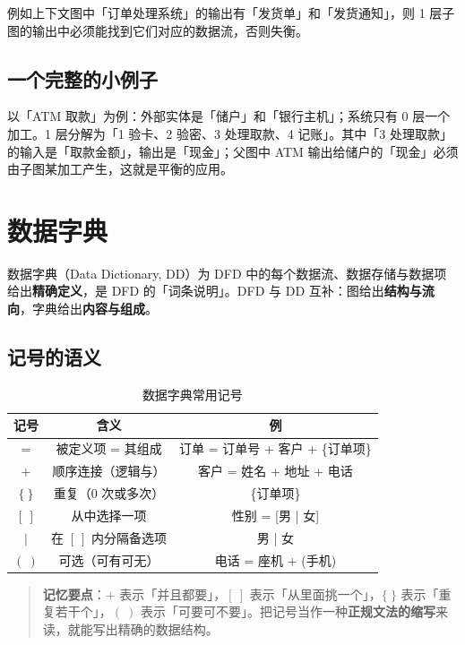 例如上下文图中「订单处理系统」的输出有「发货单」和「发货通知」，则 1 层子图的输出中必须能找到它们对应的数据流，否则失衡。

\subsection{一个完整的小例子}

以「ATM 取款」为例：外部实体是「储户」和「银行主机」；系统只有 0 层一个加工。1 层分解为「1 验卡、2 验密、3 处理取款、4 记账」。其中「3 处理取款」的输入是「取款金额」，输出是「现金」；父图中 ATM 输出给储户的「现金」必须由子图某加工产生，这就是平衡的应用。

\section{数据字典}

数据字典（Data Dictionary, DD）为 DFD 中的每个数据流、数据存储与数据项给出\textbf{精确定义}，是 DFD 的「词条说明」。DFD 与 DD 互补：图给出\textbf{结构与流向}，字典给出\textbf{内容与组成}。

\subsection{记号的语义}

\begin{table}[H]
\centering
\caption{数据字典常用记号}
\begin{tabulary}{\textwidth}{CCC}
\toprule
记号 & 含义 & 例 \\
\midrule
$=$ & 被定义项 = 其组成 & 订单 = 订单号 + 客户 + \{订单项\} \\
$+$ & 顺序连接（逻辑与） & 客户 = 姓名 + 地址 + 电话 \\
$\{\ \}$ & 重复（0 次或多次） & \{订单项\} \\
$[\ ]$ & 从中选择一项 & 性别 = [男 | 女] \\
$|$ & 在 $[\ ]$ 内分隔备选项 & 男 | 女 \\
$(\ )$ & 可选（可有可无） & 电话 = 座机 + (手机) \\
\bottomrule
\end{tabulary}
\end{table}

\begin{quote}
\textbf{记忆要点}：$+$ 表示「并且都要」，$[\ ]$ 表示「从里面挑一个」，$\{\ \}$ 表示「重复若干个」，$(\ )$ 表示「可要可不要」。把记号当作一种\textbf{正规文法的缩写}来读，就能写出精确的数据结构。
\end{quote}

